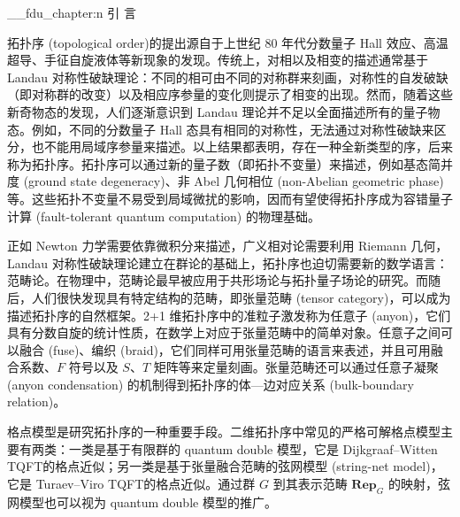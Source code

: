 \ExplSyntaxOn
\__fdu_chapter:n { 引 \quad 言 }
\ExplSyntaxOff

拓扑序 (topological order)\cite{wen1990topological,wen2013topological,wen2017colloquium,zeng2019introduction}的提出源自于上世纪 80 年代分数量子 Hall 效应\cite{tsui1982two,laughlin1983anomalous}、高温超导、手征自旋液体\cite{kalmeyer1987equivalence,wen1989chiral}等新现象的发现。传统上，对相以及相变的描述通常基于 Landau 对称性破缺理论：不同的相可由不同的对称群来刻画，对称性的自发破缺（即对称群的改变）以及相应序参量的变化则提示了相变的出现\cite{landau1980statistical,pathria2011statistical}。然而，随着这些新奇物态的发现，人们逐渐意识到 Landau 理论并不足以全面描述所有的量子物态。例如，不同的分数量子 Hall 态具有相同的对称性，无法通过对称性破缺来区分，也不能用局域序参量来描述\cite{stone1992quantum}。以上结果都表明，存在一种全新类型的序，后来称为拓扑序。拓扑序可以通过新的量子数（即拓扑不变量）来描述，例如基态简并度 (ground state degeneracy)\cite{wen1989vacuum,wen1990ground}、非 Abel 几何相位 (non-Abelian geometric phase)\cite{wen1990topological}等。这些拓扑不变量不易受到局域微扰的影响，因而有望使得拓扑序成为容错量子计算 (fault-tolerant quantum computation) 的物理基础\cite{kitaev2003fault,freedman2003topological,nayak2008nonabelian}。

正如 Newton 力学需要依靠微积分来描述，广义相对论需要利用 Riemann 几何，Landau 对称性破缺理论建立在群论的基础上，拓扑序也迫切需要新的数学语言：范畴论。在物理中，范畴论最早被应用于共形场论\cite{segal1988definition,moore1989classical}与拓扑量子场论\cite{atiyah1988topological,turaev1992state}的研究。而随后，人们很快发现具有特定结构的范畴，即张量范畴 (tensor category)，可以成为描述拓扑序的自然框架\cite{levin2005string,kitaev2006anyons}。2+1 维拓扑序中的准粒子激发称为任意子 (anyon)，它们具有分数自旋的统计性质，在数学上对应于张量范畴中的简单对象。任意子之间可以融合 (fuse)、编织 (braid)，它们同样可用张量范畴的语言来表述，并且可用融合系数、$F$ 符号以及 $S$、$T$ 矩阵等来定量刻画\cite{bakalov2001lectures,kitaev2006anyons,bruillard2016rank,aasen2020topological}。张量范畴还可以通过任意子凝聚 (anyon condensation) 的机制得到拓扑序的体—边对应关系 (bulk-boundary relation)\cite{kong2014anyon,kong2014braided,kong2015boundary,kong2017boundary,lou2021dummy}。

格点模型是研究拓扑序的一种重要手段。二维拓扑序中常见的严格可解格点模型主要有两类：一类是基于有限群的 quantum double 模型\cite{kitaev2003fault,kitaev2006anyons}，它是 Dijkgraaf--Witten TQFT\cite{dijkgraaf1990topological}的格点近似；另一类是基于张量融合范畴的弦网模型 (string-net model)\cite{levin2005string}，它是 Turaev--Viro TQFT\cite{turaev1992state,kirillov2011string}的格点近似。通过群 $G$ 到其表示范畴 $\mathbf{Rep}_G$ 的映射，弦网模型也可以视为 quantum double 模型的推广\cite{buerschaper2009mapping,buerschaper2013electric}。

